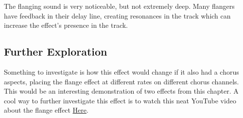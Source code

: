 The flanging sound is very noticeable, but not extremely deep. Many flangers have feedback in their delay line, creating resonances in the track which can increase the effect's presence in the track. 

\subsection{Further Exploration}
Something to investigate is how this effect would change if it also had a chorus aspects, placing the flange effect at different rates on different chorus channels. This would be an interesting demonstration of two effects from this chapter. A cool way to further investigate this effect is to watch this neat YouTube video about the flange effect \href{https://www.youtube.com/watch?v=Ici_YOVDl_0}{Here}.
